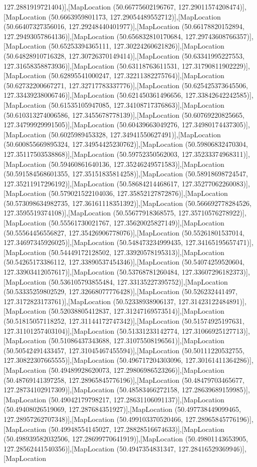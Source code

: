 127.2881919721404)],[MapLocation (50.66775602196767, 127.29011574208474)],[MapLocation (50.6663959801173, 127.29054489552712)],[MapLocation (50.66407327356016, 127.29248440401977)],[MapLocation (50.66178820152894, 127.29493057864136)],[MapLocation (50.656832810170684, 127.29743608766357)],[MapLocation (50.65253394365111, 127.30224260621826)],[MapLocation (50.64828910716328, 127.30726370149414)],[MapLocation (50.63341995227553, 127.31658358873936)],[MapLocation (50.63118763611531, 127.31790811902229)],[MapLocation (50.62895541000247, 127.32211382275764)],[MapLocation (50.62732200667271, 127.32717783337776)],[MapLocation (50.625425373645506, 127.33439238006746)],[MapLocation (50.621450361496656, 127.33842642242585)],[MapLocation (50.61535105947085, 127.34108717376863)],[MapLocation (50.610313274006586, 127.3455678778139)],[MapLocation (50.60769220825665, 127.34799929991505)],[MapLocation (50.60439663049276, 127.34980174437305)],[MapLocation (50.6025989453328, 127.34941550627491)],[MapLocation (50.600855669895324, 127.34954425230762)],[MapLocation (50.59806832470304, 127.35117503538868)],[MapLocation (50.59752350562003, 127.35233374968311)],[MapLocation (50.59460861640136, 127.35246249571583)],[MapLocation (50.591584568601355, 127.35151835814258)],[MapLocation (50.58918698724547, 127.35211917296192)],[MapLocation (50.58684214468617, 127.35277062260083)],[MapLocation (50.579021522104036, 127.35852127872876)],[MapLocation (50.573098634982735, 127.36161118351392)],[MapLocation (50.566692778284526, 127.3595519374108)],[MapLocation (50.55677918368575, 127.35710576278922)],[MapLocation (50.55561730021767, 127.35620025827149)],[MapLocation (50.55564456556827, 127.35426906778076)],[MapLocation (50.55261801537014, 127.34697345926025)],[MapLocation (50.548473234999435, 127.34165195657471)],[MapLocation (50.54449172128502, 127.33920578195313)],[MapLocation (50.54265173386112, 127.33890537454346)],[MapLocation (50.54074259520604, 127.33903412057617)],[MapLocation (50.53768781260484, 127.33607296182373)],[MapLocation (50.536105793855484, 127.33135227395752)],[MapLocation (50.53335259802529, 127.32668077776428)],[MapLocation (50.526232441497, 127.3172823173761)],[MapLocation (50.52338938906137, 127.31423122484891)],[MapLocation (50.52038805412837, 127.31247169573514)],[MapLocation (50.51815057118252, 127.31144172747342)],[MapLocation (50.51574925197631, 127.31101257403104)],[MapLocation (50.51331233142774, 127.31066925127713)],[MapLocation (50.51086437343688, 127.31075508196561)],[MapLocation (50.50542491433457, 127.31045467455594)],[MapLocation (50.50111220532755, 127.30822307665555)],[MapLocation (50.496717204303096, 127.30161411364286)],[MapLocation (50.49489928620073, 127.29806986523266)],[MapLocation (50.48769141397258, 127.28965845776196)],[MapLocation (50.48479703465677, 127.28734102917309)],[MapLocation (50.48583466272158, 127.28639689159985)],[MapLocation (50.49042179798217, 127.28631106091137)],[MapLocation (50.49408026519069, 127.287684351927)],[MapLocation (50.497738449099465, 127.28957262707348)],[MapLocation (50.499103370520466, 127.28965845776196)],[MapLocation (50.49948554145027, 127.28828516674633)],[MapLocation (50.498939582032506, 127.28699770641919)],[MapLocation (50.49801143653905, 127.28562441540356)],[MapLocation (50.4947354831347, 127.28416529369946)],[MapLocation 